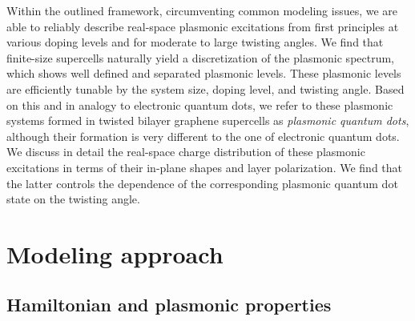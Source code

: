 Within the outlined framework, circumventing common modeling issues, we are able to reliably describe real-space plasmonic excitations from first principles at various doping levels and for moderate to large twisting angles.  We find that finite-size supercells naturally yield a discretization of the plasmonic spectrum, which shows well defined and separated plasmonic levels. These plasmonic levels are efficiently tunable by the system size, doping level, and twisting angle. Based on this and in analogy to electronic quantum dots, we refer to these plasmonic systems formed in twisted bilayer graphene supercells as \emph{plasmonic quantum dots}, although their formation is very different to the one of electronic quantum dots. We discuss in detail the real-space charge distribution of these plasmonic excitations in terms of their in-plane shapes and layer polarization. We find that the latter controls the dependence of the corresponding plasmonic quantum dot state on the twisting angle.

\section{Modeling approach}

\subsection{Hamiltonian and plasmonic properties}

